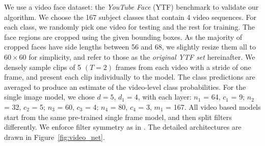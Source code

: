 \documentclass[10pt,twocolumn,twoside]{IEEEtran} %
\begin{document}
We use a video face dataset: the \textit{YouTube Face} (YTF) benchmark \cite{wolf2011face} to validate our algorithm.
We choose the 167 subject classes that contain 4 video sequences.
For each class, we randomly pick one video for testing and the rest for training. The face regions are cropped using the given bounding boxes. As the majority of cropped faces have side lengths between 56 and 68, we slightly resize them all to $60 \times 60$ for simplicity, and refer to those as the \textit{original YTF set} hereinafter. We densely sample clips of 5 $(T = 2)$ frames  from each video with a stride of one frame, and present each clip individually to the model. The class predictions are averaged to produce an estimate of the video-level class probabilities. For the single image model,  we chose $d = 5$, $d_1 = 4$, with each layer: $n_1$ = 64, $c_1$ = 9; $n_2$ = 32, $c_2$ = 5; $n_3$ = 60, $c_3$ = 4; $n_4$ = 80, $c_4$ = 3, $m_1$ = 167. All video based models start from the same pre-trained single frame model, and then split filters differently. We enforce filter symmetry as in \cite{kappeler2016video}.  The detailed architectures are drawn in Figure~\ref{fig:video_net}.  
\end{document}
